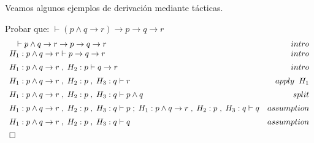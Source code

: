 \documentclass[11pt,letterpaper]{article}
\begin{document}


\medskip

Veamos algunos ejemplos de derivación mediante tácticas.
\bi
\item Probar que: \hspace{0.5cm} 
$\vdash (p \land q \to r) \to p \to q \to r$  
\[
\begin{array}{lr}
 \quad \vdash p \land q \to r \imp  p  \to q \to r &   
 intro\\  \vspace*{5pt}
 H_1: p \land q \to r \vdash  p  \to q \to r &  
 intro\\ \vspace*{5pt}
 H_1: p \land q \to r \; , \; H_2: p  \vdash q \to r & 
 intro \\ \vspace*{5pt}
 H_1: p \land q \to r \; , \; H_2: p \; , \; H_3: q \vdash  r &
 apply \;\; H_1\\ \vspace*{5pt}
 H_1: p \land q \to r \; , \; H_2: p \; , \; H_3: q \vdash p \land q &
 split \\ \vspace*{5pt}
 H_1: p \land q \to r \; , \; H_2: p \; , \; H_3: q \vdash p \; ; \; 
 H_1: p \land q \to r \; , \; H_2: p \; , \; H_3: q \vdash q & 
 assumption \\ \vspace*{5pt}
 H_1: p \land q \to r \; , \; H_2: p \; , \; H_3: q \vdash q & 
 assumption \\ \vspace*{5pt}
 \square & 
\end{array}
\]
\end{document}
